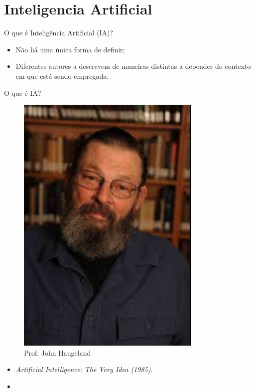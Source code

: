 \section{Inteligencia Artificial}


\begin{frame}{O que é Inteligência Artificial (IA)?}
    \begin{block}{}
        \begin{itemize}
            \item Não há uma única forma de definir; 
            \item Diferentes autores a descrevem de maneiras distintas a depender do contexto em que está sendo empregada.
        \end{itemize}
    \end{block}
\end{frame}
\begin{frame}{O que é IA?}
    \begin{minipage}{0.5\linewidth}
        \begin{figure}
            \centering
            \includegraphics[width=0.6\linewidth]{imagens//secao1/haugeland1985.png}
            \caption{Prof. John Haugeland}
        \end{figure}
    \end{minipage}
    \begin{minipage}{0.5\linewidth}
        \begin{itemize}
        \justifying
            \item \textit{Artificial Intelligence: The Very Idea (1985).}
            \item {}
        \end{itemize}
    \end{minipage}
\end{frame}

